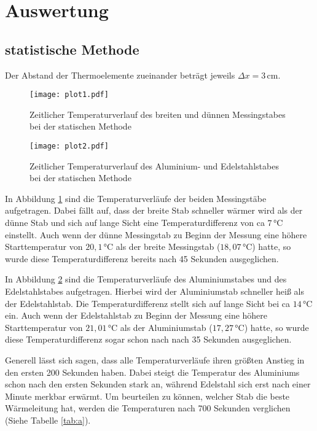 \section{Auswertung}
\label{sec:Auswertung}
\subsection{statistische Methode}

Der Abstand der Thermoelemente zueinander beträgt jeweils $\Delta x=3\,\si{\centi\meter}$.


\begin{figure}[H]
  \centering
  \texttt{[image: plot1.pdf]}
  \caption{Zeitlicher Temperaturverlauf des breiten und dünnen Messingstabes bei der statischen Methode}
  \label{fig:a}
\end{figure}

\begin{figure}[H]
  \centering
  \texttt{[image: plot2.pdf]}
  \caption{Zeitlicher Temperaturverlauf des Aluminium- und Edelstahlstabes bei der statischen Methode}
  \label{fig:b}
\end{figure}

\noindent In Abbildung \ref{fig:a} sind die Temperaturverläufe der beiden Messingstäbe aufgetragen. Dabei fällt auf, dass der breite Stab schneller
wärmer wird als der dünne Stab und sich auf lange Sicht eine Temperaturdifferenz von ca $7\,\si{\celsius}$ einstellt. Auch wenn 
der dünne Messingstab zu Beginn der Messung eine höhere Starttemperatur von $20,1\,\si{\celsius}$ als der breite Messingstab ($18,07\,\si{\celsius}$) hatte, so wurde
diese Temperaturdifferenz bereits nach 45 Sekunden ausgeglichen.


\noindent In Abbildung \ref{fig:b} sind die Temperaturverläufe des Aluminiumstabes und des Edelstahlstabes aufgetragen. Hierbei
wird der Aluminiumstab schneller heiß als der Edelstahlstab. Die Temperaturdifferenz stellt sich auf lange Sicht bei ca $14\,\si{\celsius}$ ein. Auch wenn 
der Edelstahlstab zu Beginn der Messung eine höhere Starttemperatur von $21,01\,\si{\celsius}$ als der Aluminiumstab ($17,27\,\si{\celsius}$) hatte, so wurde
diese Temperaturdifferenz sogar schon nach nach 35 Sekunden ausgeglichen.


\noindent Generell lässt sich sagen, dass alle Temperaturverläufe ihren größten Anstieg in den ersten 200 Sekunden haben. Dabei steigt die
Temperatur des Aluminiums schon nach den ersten Sekunden stark an, während Edelstahl sich erst nach einer Minute merkbar erwärmt.
Um beurteilen zu können, welcher Stab die beste Wärmeleitung hat, werden die Temperaturen nach 700 Sekunden verglichen (Siehe Tabelle \ref{tab:a}).


